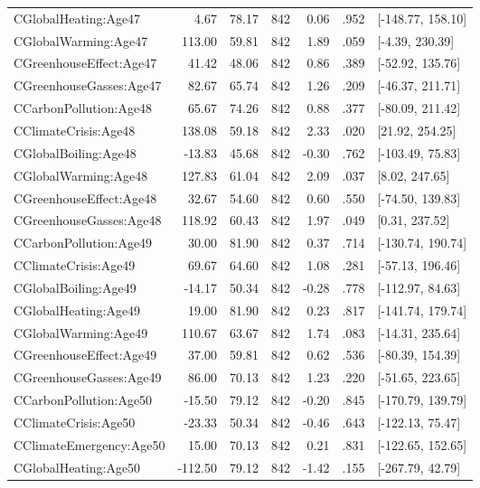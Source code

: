 \begin{table}[ht]
\begin{tabular}{lrrrrrl}
  CGlobalHeating:Age47 & 4.67 & 78.17 & 842 & 0.06 & .952 & [-148.77, 158.10] \\ 
  CGlobalWarming:Age47 & 113.00 & 59.81 & 842 & 1.89 & .059 & [-4.39, 230.39] \\ 
  CGreenhouseEffect:Age47 & 41.42 & 48.06 & 842 & 0.86 & .389 & [-52.92, 135.76] \\ 
  CGreenhouseGasses:Age47 & 82.67 & 65.74 & 842 & 1.26 & .209 & [-46.37, 211.71] \\ 
  CCarbonPollution:Age48 & 65.67 & 74.26 & 842 & 0.88 & .377 & [-80.09, 211.42] \\ 
  CClimateCrisis:Age48 & 138.08 & 59.18 & 842 & 2.33 & .020 & [21.92, 254.25] \\ 
  CGlobalBoiling:Age48 & -13.83 & 45.68 & 842 & -0.30 & .762 & [-103.49, 75.83] \\ 
  CGlobalWarming:Age48 & 127.83 & 61.04 & 842 & 2.09 & .037 & [8.02, 247.65] \\ 
  CGreenhouseEffect:Age48 & 32.67 & 54.60 & 842 & 0.60 & .550 & [-74.50, 139.83] \\ 
  CGreenhouseGasses:Age48 & 118.92 & 60.43 & 842 & 1.97 & .049 & [0.31, 237.52] \\ 
  CCarbonPollution:Age49 & 30.00 & 81.90 & 842 & 0.37 & .714 & [-130.74, 190.74] \\ 
  CClimateCrisis:Age49 & 69.67 & 64.60 & 842 & 1.08 & .281 & [-57.13, 196.46] \\ 
  CGlobalBoiling:Age49 & -14.17 & 50.34 & 842 & -0.28 & .778 & [-112.97, 84.63] \\ 
  CGlobalHeating:Age49 & 19.00 & 81.90 & 842 & 0.23 & .817 & [-141.74, 179.74] \\ 
  CGlobalWarming:Age49 & 110.67 & 63.67 & 842 & 1.74 & .083 & [-14.31, 235.64] \\ 
  CGreenhouseEffect:Age49 & 37.00 & 59.81 & 842 & 0.62 & .536 & [-80.39, 154.39] \\ 
  CGreenhouseGasses:Age49 & 86.00 & 70.13 & 842 & 1.23 & .220 & [-51.65, 223.65] \\ 
  CCarbonPollution:Age50 & -15.50 & 79.12 & 842 & -0.20 & .845 & [-170.79, 139.79] \\ 
  CClimateCrisis:Age50 & -23.33 & 50.34 & 842 & -0.46 & .643 & [-122.13, 75.47] \\ 
  CClimateEmergency:Age50 & 15.00 & 70.13 & 842 & 0.21 & .831 & [-122.65, 152.65] \\ 
  CGlobalHeating:Age50 & -112.50 & 79.12 & 842 & -1.42 & .155 & [-267.79, 42.79] \\ 

\end{tabular}
\end{table}
